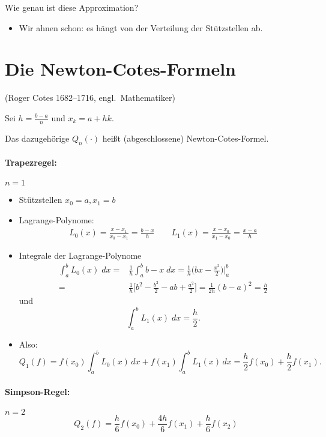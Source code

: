 \bigskip

Wie genau ist diese Approximation?
\begin{itemize}
\item Wir ahnen schon: es hängt von der Verteilung der Stützstellen ab.
\end{itemize}

\section{Die Newton-Cotes-Formeln}

(Roger Cotes 1682--1716, engl.\ Mathematiker)

\bigskip

Sei $h = \frac{b - a}{n}$ und $x_k = a + hk$.

\medskip

Das dazugehörige $Q_n(\cdot)$ heißt (abgeschlossene) Newton-Cotes-Formel.
\paragraph{Trapezregel:} $n =1$
\begin{itemize}
 \item Stützstellen $x_0 = a, x_1 = b$

 \item Lagrange-Polynome:
\begin{align*}
L_0(x) = \frac{x-x_1}{x_0 - x_1} = \frac{b-x}{h}
\qquad
L_1(x) = \frac{x-x_0}{x_1 - x_0} = \frac{x-a}{h}
\end{align*}
\item Integrale der Lagrange-Polynome
\begin{align*}
\int_a^bL_0(x) \; dx = & \frac{1}{h} \int_a^b b-x \; dx = \frac{1}{h} \Big(bx - \frac{x^2}{2}\Big)\bigg\vert^b_a
\\ = & \frac{1}{h} \Big[ b^2 - \frac{b^2}{2} - ab + \frac{a^2}{2} \Big] = \frac{1}{2h} (b-a)^2 = \frac{h}{2}
\end{align*}
 und
 \begin{equation*}
\int_a^b L_1(x) \; dx = \frac{h}{2}.
\end{equation*}
 \item Also: \begin{equation*}
Q_1(f) = f(x_0) \int_a^b L_0(x) \,dx + f(x_1)\int_a^b L_1(x) \,dx = \frac{h}{2} f(x_0) + \frac{h}{2} f(x_1).
\end{equation*}
\end{itemize}

\paragraph{Simpson-Regel:} $n=2$
\begin{equation*}
Q_2(f) = \frac{h}{6} f(x_0) + \frac{4h}{6} f(x_1) + \frac{h}{6} f(x_2)
\end{equation*}

